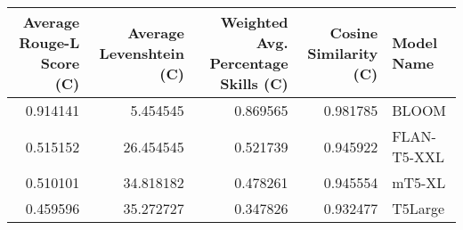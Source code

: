 \begin{tabular}{rrrrl}
\toprule
Average Rouge-L Score (C) & Average Levenshtein (C) & Weighted Avg. Percentage Skills (C) & Cosine Similarity (C) & Model Name \\
\midrule
0.914141 & 5.454545 & 0.869565 & 0.981785 & BLOOM \\
0.515152 & 26.454545 & 0.521739 & 0.945922 & FLAN-T5-XXL \\
0.510101 & 34.818182 & 0.478261 & 0.945554 & mT5-XL \\
0.459596 & 35.272727 & 0.347826 & 0.932477 & T5Large \\
\bottomrule
\end{tabular}
